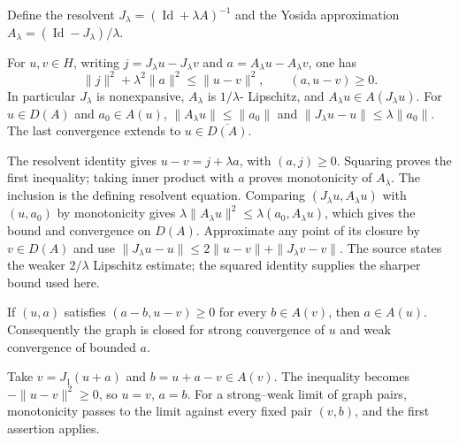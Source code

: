 Define the resolvent $J_\lambda=(\operatorname{Id}+\lambda A)^{-1}$
and the Yosida approximation $A_\lambda=(\operatorname{Id}-J_\lambda)/\lambda$.
\Needspace{50mm}
\begin{theorem}
For $u,v\in H$, writing $j=J_\lambda u-J_\lambda v$ and
$a=A_\lambda u-A_\lambda v$, one has
\[
 \|j\|^2+\lambda^2\|a\|^2\leq\|u-v\|^2,\qquad (a,u-v)\geq0.
\]
In particular $J_\lambda$ is nonexpansive, $A_\lambda$ is $1/\lambda$-
Lipschitz, and $A_\lambda u\in A(J_\lambda u)$.
For $u\in D(A)$ and $a_0\in A(u)$,
$\|A_\lambda u\|\leq\|a_0\|$ and
$\|J_\lambda u-u\|\leq\lambda\|a_0\|$.
The last convergence extends to $u\in\overline{D(A)}$.
\end{theorem}
\begin{expandedproof}
The resolvent identity gives $u-v=j+\lambda a$, with $(a,j)\geq0$.
Squaring proves the first inequality; taking inner product with $a$
proves monotonicity of $A_\lambda$. The inclusion is the defining
resolvent equation. Comparing $(J_\lambda u,A_\lambda u)$ with
$(u,a_0)$ by monotonicity gives
$\lambda\|A_\lambda u\|^2\leq\lambda(a_0,A_\lambda u)$,
which gives the bound and convergence on $D(A)$. Approximate any point
of its closure by $v\in D(A)$ and use
$\|J_\lambda u-u\|\leq2\|u-v\|+\|J_\lambda v-v\|$.
The source states the weaker $2/\lambda$ Lipschitz estimate; the squared
identity supplies the sharper bound used here.
\end{expandedproof}
\Needspace{50mm}
\begin{lemma}
If $(u,a)$ satisfies $(a-b,u-v)\geq0$ for every $b\in A(v)$,
then $a\in A(u)$. Consequently the graph is closed for strong convergence
of $u$ and weak convergence of bounded $a$.
\end{lemma}
\begin{expandedproof}
Take $v=J_1(u+a)$ and $b=u+a-v\in A(v)$. The inequality becomes
$-\|u-v\|^2\geq0$, so $u=v$, $a=b$. For a strong--weak limit of
graph pairs, monotonicity passes to the limit against every fixed pair
$(v,b)$, and the first assertion applies.
\end{expandedproof}
\Needspace{42mm}

\Needspace{40mm}
